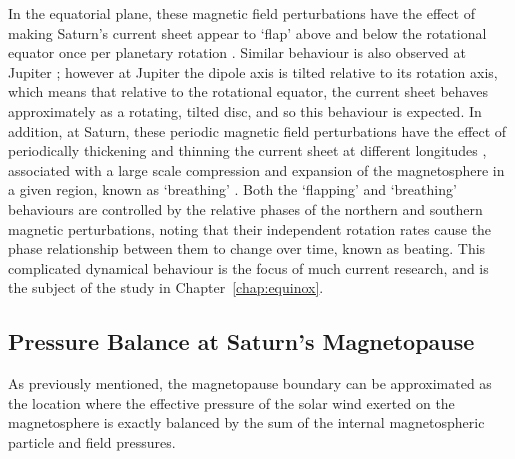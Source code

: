 In the equatorial plane, these magnetic field perturbations have the effect of making Saturn's current sheet appear to `flap' above and below the rotational equator once per planetary rotation \citep[e.g.][]{arridge2011}. Similar behaviour is also observed at Jupiter \citep[e.g.][]{khurana1989}; however at Jupiter the dipole axis is tilted  relative to its rotation axis, which means that relative to the rotational equator, the current sheet behaves approximately as a rotating, tilted disc, and so this behaviour is expected. In addition, at Saturn, these periodic magnetic field perturbations have the effect of periodically thickening and thinning the current sheet at different longitudes \citep{provan2012}, associated with a large scale compression and expansion of the magnetosphere in a given region, known as `breathing' \citep{ramer2016}. Both the `flapping' and `breathing' behaviours are controlled by the relative phases of the northern and southern magnetic perturbations, noting that their independent rotation rates cause the phase relationship between them to change over time, known as beating. This complicated dynamical behaviour is the focus of much current research, and is the subject of the study in Chapter~\ref{chap:equinox}.

\subsection{Pressure Balance at Saturn's Magnetopause}\label{intro:sec:pbalance}
As previously mentioned, the magnetopause boundary can be approximated as the location where the effective pressure of the solar wind exerted on the magnetosphere is exactly balanced by the sum of the internal magnetospheric particle and field pressures. 

